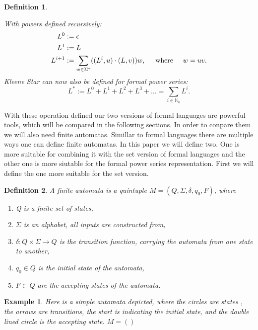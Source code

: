\documentclass[12pt,letterpaper]{article}
\newtheorem{definition}{Definition}
\newtheorem{example}{Example}[section]
\begin{document}
\begin{definition}
\begin{center}
  \end{center}
  With powers defined recursively:
  \begin{align*}
    L^0 &:= \epsilon\\
    L^1 &:= L\\
    L^{i+1} &:= \sum_{w \in \Sigma^*} ((L^i,u)\cdot (L,v))w, 
    \hspace{0.5cm} \text{where} \hspace{0.5cm} w = uv.
  \end{align*}
  Kleene Star can now also be defined for formal power series:
  \[
    L^* := L^0 + L^1 + L^2 + L^3 + \dots = \sum_{i \in \mathbb{N}_0} L^i.
  \]
\end{definition}
With these operation defined our two versions of formal languages are 
powerful tools, which will be compared in the following sections. In order
to conpare them we will also need finite automatas. Simillar to formal languages
there are multiple ways one can define finite automatas. In this paper we
will define two. One is more suitable for combining it with the set version
of formal languages and the other one is more siutable for the formal power
series representation. First we will define the one more suitable for the
set version.
\begin{definition}
  A finite automata is a quintuple $M = (Q, \Sigma, \delta, q_0, F)$, 
  where
  \begin{enumerate}
    \item Q is a finite set of states,
    \item $\Sigma$ is an alphabet, all inputs are constructed from,
    \item $\delta: Q \times \Sigma \to Q$ is the transition function,
      carrying the automata from one state to another,
    \item $q_0 \in Q$ is the initial state of the automata,
    \item $F \subset Q$ are the accepting states of the automata.
  \end{enumerate}
\end{definition}
\begin{example}
  Here is a simple automata depicted, where the circles are states
  , the arrows are transitions, the start is indicating the initial 
  state, and the double lined circle is the accepting state.
  $M = ()$
\end{example}
\end{document}
